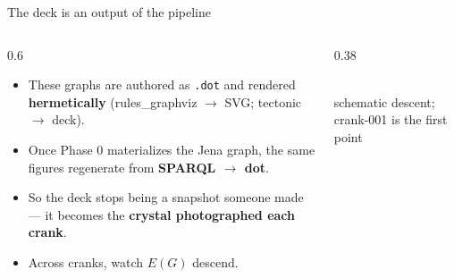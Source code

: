 \documentclass[aspectratio=169,11pt]{beamer}
\begin{document}
\begin{frame}{The deck is an output of the pipeline}
  \begin{columns}[c]
    \begin{column}{0.6\textwidth}
      \begin{itemize}\setlength\itemsep{4pt}
        \item These graphs are authored as \texttt{.dot} and rendered \textbf{hermetically} (rules\_graphviz $\to$ SVG; tectonic $\to$ deck).
        \item Once Phase 0 materializes the Jena graph, the same figures regenerate from \textbf{SPARQL $\to$ dot}.
        \item So the deck stops being a snapshot someone made --- it becomes the \textbf{crystal photographed each crank}.
        \item Across cranks, watch $E(G)$ descend.
      \end{itemize}
    \end{column}
    \begin{column}{0.38\textwidth}
      \centering
      \\[2pt]
      {\scriptsize schematic descent; crank-001 is the first point}
    \end{column}
  \end{columns}
\end{frame}
\end{document}
